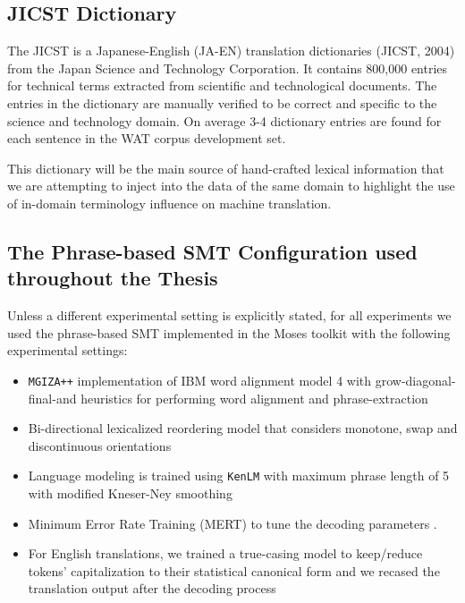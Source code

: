 
\subsection{JICST Dictionary}

The JICST is a Japanese-English (JA-EN) translation dictionaries (JICST, 2004) from the Japan Science and Technology Corporation. It contains 800,000 entries for technical terms extracted from scientific and technological documents. 
The entries in the dictionary are manually verified to be correct and specific to the science and technology domain.
On average 3-4 dictionary entries are found for each sentence in the WAT corpus development set.

This dictionary will be the main source of hand-crafted lexical information that we are attempting to inject into the data of the same domain to highlight the use of in-domain terminology influence on machine translation.


\newpage
\subsection{The Phrase-based SMT Configuration used throughout the Thesis}

Unless a different experimental setting is explicitly stated, for all experiments we used the phrase-based SMT implemented in the Moses toolkit \citep{koehn2007moses} with the following experimental settings:

\begin{itemize}

\item {\tt MGIZA++} implementation of IBM word alignment model 4 with grow-diagonal-final-and heuristics for performing word alignment and phrase-extraction \citep{koehn2003statistical,och2003systematic,gao2008parallel}

\item Bi-directional lexicalized reordering model that considers monotone, swap and discontinuous orientations \citep{koehn2005europarl,galley2008simple}

\item Language modeling is trained using {\tt KenLM} with maximum phrase length of 5 with modified Kneser-Ney smoothing \citep{kenlm,kneser1995improved,chen1999empirical}

\item Minimum Error Rate Training (MERT) to tune the decoding parameters \citep{mert}.

\item For English translations, we trained a true-casing model to keep/reduce tokens’ capitalization to their statistical canonical form \citep{wangknightmarcu2006,lita2003} and we recased the translation output after the decoding process

\end{itemize}

